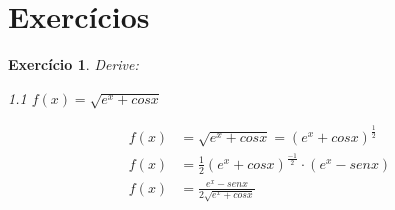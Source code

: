 \documentclass{book}
\numberwithin{defn}{chapter}
\numberwithin{exe}{chapter}
\newtheorem{ex}{Exercício}
\numberwithin{ex}{chapter}
\numberwithin{obs}{chapter}
\numberwithin{fato}{chapter}
\newtheorem{resp}{Resposta}
\numberwithin{resp}{chapter}
\begin{document}
\section{Exercícios}
\begin{ex}
Derive:
\item 1.1 $f(x)=\sqrt{e^x+cosx}$ %

\begin{align*}
    f(x)&=\sqrt{e^x+cosx}=(e^x+cosx)^{\frac{1}{2}}\\
    f(x)&=\frac{1}{2}(e^x+cosx)^{\frac{-1}{2}}\cdot (e^x-senx)\\
    f(x)&=\frac{e^x-senx}{2\sqrt{e^x+cosx}}
\end{align*}

\begin{comment}
\begin{resp}
\item 1.2 $f(x)=e^{x+{\frac{1}{x}}}$ %

\begin{align*}
    f(x)&=e^{x+{\frac{1}{x}}}\\
    f'(x)&=e^{x^{10}+\frac{1}{x}}\cdot \left(10^{x^{9}}-\frac{1}{x^2}\right)
\end{align*}

\item 1.3 $f(x)=sen(e^x+9x^2)$ %

\begin{align*}
    f(x)&=sen(e^x+9x^2)\\
    f'(x)&=cos(e^x+9x^2)\cdot (e^x+18x)
\end{align*}

\item 1.4 $f(x)=\frac{3}{x^5+10x}$
\begin{align*}
    f(x)&=\frac{3}{x^5+10x}\\
    f'(x)&=3(x^5+10x)^{-1}\\
    f'(x)&=3(x^5+10x)^{-2}\cdot (5x^4+10)\\
    f'(x)&=\frac{15x^4+30}{(x^5+10x)^2}
\end{align*}


\item 1.5 $f(x)=x^4+\frac{90x^5}{\sqrt{x}}$ %
\begin{align*}
    f(x)&=x^4+\frac{90x^5}{\sqrt{x}}\\
    f'(x)&= x^4+90x^{\frac{9}{2}}\\
    f'(x)&=4x^3+405x^\frac{7}{2}
\end{align*}

\end{resp}
\end{comment}
\end{ex}
\end{document}
